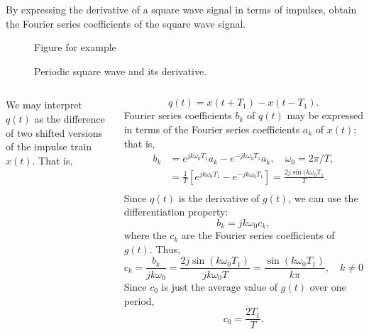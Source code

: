 \begin{frame}
    \begin{example}
        By expressing the derivative of a square wave signal in terms of impulses, obtain the Fourier series coefficients of the square wave signal.
        \begin{figure}
          \centering
          
          \caption{Figure for example}\label{fi:example3p8_square}
        \end{figure}
    \end{example}
\end{frame}

\begin{frame}
{
    \begin{figure}
      \centering
      
      \caption{Periodic square wave and its derivative.}\label{fi:deriv_periodic_square}
    \end{figure}
}
\end{frame}

\begin{frame}
{
    \begin{columns}

        We may interpret $q(t)$ as the difference of two shifted versions of the impulse train $x(t)$. That is,

        \begin{equation*}
            q(t) = x(t+T_1) - x(t-T_1).
        \end{equation*}
        \pause
        Fourier series coefficients $b_k$ of $q(t)$ may be expressed in terms of the Fourier series coefficients $a_k$ of $x(t)$; that is,
        \begin{equation*}
            \begin{split}
            b_k &= e^{jk\omega_0 T_1}a_k - e^{-jk\omega_0 T_1}a_k, \quad \omega_0 = 2\pi/T,\\
                &= \frac{1}{T}\left[e^{jk\omega_0 T_1} - e^{-jk\omega_0 T_1}\right] = \frac{2j\sin(k\omega_0 T_1}{T}.\\
            \end{split}
        \end{equation*}
        \pause
        Since $q(t)$ is the derivative of $g(t)$, we can use the differentiation property:
        \begin{equation*}
            b_k = jk\omega_0c_k,
        \end{equation*}
        where the $c_k$ are the Fourier series coefficients of $g(t)$. Thus,
        \begin{equation*}
            c_k = \frac{b_k}{jk\omega_0} = \frac{2j\sin(k\omega_0 T_1)}{jk\omega_0T} = \frac{\sin(k\omega_0 T_1)}{k\pi}, \quad k\neq 0
        \end{equation*}
        Since $c_0$ is just the average value of $g(t)$ over one period,
        \begin{equation*}
            c_0 = \frac{2T_1}{T}.
        \end{equation*}
    \end{columns}
}
\end{frame}

